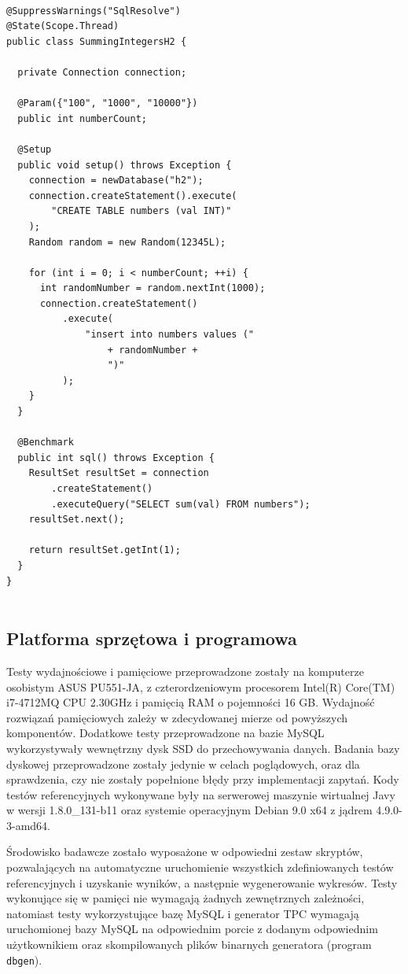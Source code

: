 \documentclass[12pt,twoside,openright]{extarticle}
\begin{document}
\begin{lstlisting}[label=testclass, caption=Przykładowa klasa JMH]

@SuppressWarnings("SqlResolve")
@State(Scope.Thread)
public class SummingIntegersH2 {
  
  private Connection connection;
  
  @Param({"100", "1000", "10000"})
  public int numberCount;
  
  @Setup
  public void setup() throws Exception {
    connection = newDatabase("h2");
    connection.createStatement().execute(
        "CREATE TABLE numbers (val INT)"
    );
    Random random = new Random(12345L);
    
    for (int i = 0; i < numberCount; ++i) {
      int randomNumber = random.nextInt(1000);
      connection.createStatement()
          .execute(
              "insert into numbers values ("
                  + randomNumber +
                  ")"
          );
    }
  }
  
  @Benchmark
  public int sql() throws Exception {
    ResultSet resultSet = connection
        .createStatement()
        .executeQuery("SELECT sum(val) FROM numbers");
    resultSet.next();
    
    return resultSet.getInt(1);
  }
}


\end{lstlisting}

\subsection{Platforma sprzętowa i programowa}

    Testy wydajnościowe i pamięciowe przeprowadzone zostały na komputerze osobistym ASUS PU551-JA, z czterordzeniowym procesorem Intel(R) Core(TM) i7-4712MQ CPU 2.30GHz i pamięcią RAM o pojemności 16 GB. Wydajność rozwiązań pamięciowych zależy w zdecydowanej mierze od powyższych komponentów. Dodatkowe testy przeprowadzone na bazie MySQL wykorzystywały wewnętrzny dysk SSD  do przechowywania danych. Badania bazy dyskowej przeprowadzone zostały jedynie w celach poglądowych, oraz dla sprawdzenia, czy nie zostały popełnione błędy przy implementacji zapytań. Kody testów referencyjnych wykonywane były na serwerowej maszynie wirtualnej Javy w wersji 1.8.0\_131-b11 oraz systemie operacyjnym Debian 9.0 x64 z jądrem 4.9.0-3-amd64.

    Środowisko badawcze zostało wyposażone w odpowiedni zestaw skryptów, pozwalających na automatyczne uruchomienie wszystkich zdefiniowanych testów referencyjnych i uzyskanie wyników, a następnie wygenerowanie wykresów. Testy wykonujące się w pamięci nie wymagają żadnych zewnętrznych zależności, natomiast testy wykorzystujące bazę MySQL i generator TPC wymagają uruchomionej bazy MySQL na odpowiednim porcie z dodanym odpowiednim użytkownikiem oraz skompilowanych plików binarnych generatora (program \texttt{dbgen}).
\end{document}
